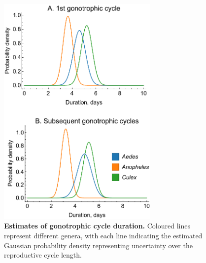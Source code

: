 \documentclass[12pt]{article}
\begin{document}
\begin{figure}[h]
	\centerline{\includegraphics[width=0.7\textwidth]{./Figure_files/gonotrophic_cycle_durations.pdf}}
	\caption{\textbf{Estimates of gonotrophic cycle duration.} Coloured lines represent different genera, with each line indicating the estimated Gaussian probability density representing uncertainty over the reproductive cycle length.}
	\label{fig:gonotrophic}
\end{figure}
\end{document}

